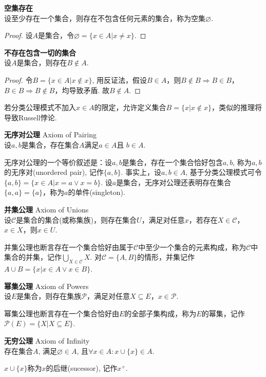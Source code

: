 \begin{col}\textbf{空集存在}\\
设至少存在一个集合，则存在不包含任何元素的集合，称为空集$\varnothing$.
\end{col}
\begin{proof}
    设$A$是集合，令$\varnothing=\{x\in A\vert x\neq x\}$. 
\end{proof} 

\begin{col}\textbf{不存在包含一切的集合}\\
设$A$是集合，则存在$B \notin A$.
\end{col}
\begin{proof}
    令$B=\{x\in A\vert x\notin x\}$, 用反证法，假设$B\in A$，则$B\notin B\Rightarrow B\in B$，$B\in B\Rightarrow B\notin B$，均导致矛盾. 故$B\notin A$. 
\end{proof}
若分类公理模式不加入$x\in A$的限定，允许定义集合$B=\{x\vert x\notin x\}$，类似的推理将导致Russell悖论.

\begin{axi} \textbf{无序对公理} Axiom of Pairing\\
设$a,b$是集合，存在集合$A$满足$a\in A$且 $b \in A$. 
\end{axi}
无序对公理的一个等价叙述是：设$a,b$是集合，存在一个集合恰好包含$a, b$, 称为$a,b$的无序对(unordered pair), 记作$\{a,b\}$. 事实上，设$a,b \in A$, 基于分类公理模式可令$\{a,b\}=\{x\in A\vert x=a \lor x=b\}$. 设$a$是集合，无序对公理还表明存在集合$\{a,a\}=\{a\}$，称为$a$的单件(singleton).

\begin{axi} \textbf{并集公理} Axiom of Unions\\
设$\mathcal{C}$是集合的集合(或称集族)，则存在集合$U$，满足对任意$x$，若存在$X\in \mathcal{C}$，$x\in X$，则$x\in U$. 
\end{axi}
并集公理也断言存在一个集合恰好由属于$\mathcal{C}$中至少一个集合的元素构成，称为$\mathcal{C}$中集合的并集，记作$\bigcup_{X\in \mathcal{C}}X$. 对$\mathcal{C}=\{A,B\}$的情形，并集记作$A\cup B=\{x|x\in A \lor x\in B\}$.

\begin{axi} \textbf{幂集公理} Axiom of Powers\\
设$E$是集合，则存在集族$\mathcal{P}$，满足对任意$X\subseteq E$，$x\in \mathcal{P}$. 
\end{axi}
幂集公理也断言存在一个集合恰好由$E$的全部子集构成，称为$E$的幂集，记作$\mathcal{P}(E)=\{X\vert X\subseteq E\}$.

\begin{axi} \textbf{无穷公理} Axiom of Infinity\\
存在集合$A$, 满足$\varnothing \in A$, 且$\forall x\in A : x\cup \{x\} \in A$.
\end{axi}
$x\cup \{x\}$称为$x$的后继(sucessor), 记作$x^{+}$.

